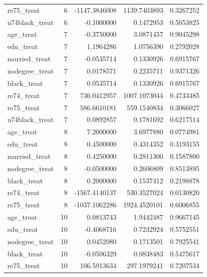 \documentclass[
]{article}
\begin{document}
\begin{enumerate}
\begin{longtable}[]{@{}lrrrr@{}}
  re75\_treat & 6 & -1147.3846008 & 1139.7403893 & 0.3267252 \\
  u74black\_treat & 6 & -0.1000000 & 0.1472953 & 0.5053825 \\
  age\_treat & 7 & -0.3750000 & 3.0871457 & 0.9045298 \\
  edu\_treat & 7 & 1.1964286 & 1.0756390 & 0.2792028 \\
  married\_treat & 7 & -0.0535714 & 0.1330926 & 0.6915767 \\
  nodegree\_treat & 7 & 0.0178571 & 0.2235711 & 0.9371326 \\
  black\_treat & 7 & 0.0535714 & 0.1330926 & 0.6915767 \\
  re74\_treat & 7 & 736.0412957 & 1007.1073044 & 0.4733485 \\
  re75\_treat & 7 & 586.6610181 & 559.1540834 & 0.3066027 \\
  u74black\_treat & 7 & 0.0892857 & 0.1781692 & 0.6217514 \\
  age\_treat & 8 & 7.2000000 & 3.6977880 & 0.0774981 \\
  edu\_treat & 8 & 0.4500000 & 0.4314352 & 0.3193155 \\
  married\_treat & 8 & 0.4250000 & 0.2811300 & 0.1587800 \\
  nodegree\_treat & 8 & -0.0500000 & 0.2606809 & 0.8513895 \\
  black\_treat & 8 & 0.2000000 & 0.1537412 & 0.2198878 \\
  re74\_treat & 8 & -1567.4140137 & 530.3527024 & 0.0130820 \\
  re75\_treat & 8 & -1037.1062286 & 1924.4520101 & 0.6006855 \\
  age\_treat & 10 & 0.0813743 & 1.9442487 & 0.9667145 \\
  edu\_treat & 10 & -0.4068716 & 0.7232924 & 0.5752551 \\
  nodegree\_treat & 10 & 0.0452080 & 0.1713501 & 0.7925541 \\
  black\_treat & 10 & -0.0506329 & 0.0838483 & 0.5475617 \\
  re75\_treat & 10 & 106.5913634 & 297.1979241 & 0.7207534 \\
  \end{longtable}


\end{enumerate}
\end{document}
